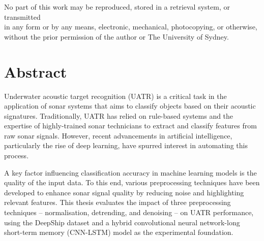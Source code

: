 \onehalfspacing

\restoregeometry
\onehalfspacing

\clearpage\null\thispagestyle{empty}
\clearpage\null\thispagestyle{empty}
\begin{center}
    \vspace*{\fill}
    
    
    No part of this work may be reproduced, stored in a retrieval system, or transmitted \\
    in any form or by any means, electronic, mechanical, photocopying, or otherwise, \\
    without the prior permission of the author or The University of Sydney.
\end{center}

\clearpage\null\thispagestyle{empty}
\chapter*{Abstract}

Underwater acoustic target recognition (UATR) is a critical task in the application of sonar systems that aims to classify objects based on their acoustic signatures. Traditionally, UATR has relied on rule-based systems and the expertise of highly-trained sonar technicians to extract and classify features from raw sonar signals. However, recent advancements in artificial intelligence, particularly the rise of deep learning, have spurred interest in automating this process. 

A key factor influencing classification accuracy in machine learning models is the quality of the input data. To this end, various preprocessing techniques have been developed to enhance sonar signal quality by reducing noise and highlighting relevant features. This thesis evaluates the impact of three preprocessing techniques -- normalisation, detrending, and denoising -- on UATR performance, using the DeepShip dataset and a hybrid convolutional neural network-long short-term memory (CNN-LSTM) model as the experimental foundation.

